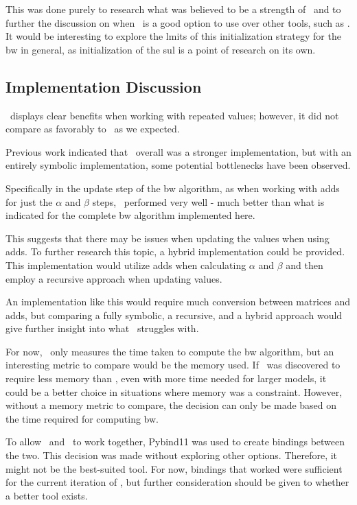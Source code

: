 This was done purely to research what was believed to be a strength of \Cupaal\ and to further the discussion on when \Cupaal\ is a good option to use over other tools, such as \Jajapy.
It would be interesting to explore the lmits of this initialization strategy for the \gls{bw} in general, as initialization of the \gls{sul} is a point of research on its own.


\subsection{Implementation Discussion}\label{subsec:implementation_discussion}
\Cupaal\ displays clear benefits when working with repeated values; however, it did not compare as favorably to \Jajapy\ as we expected.

Previous work indicated that \Cupaal\ overall was a stronger implementation, but with an entirely symbolic implementation, some potential bottlenecks have been observed.

Specifically in the update step of the \gls{bw} algorithm, as when working with \glspl{add} for just the $\alpha$ and $\beta$ steps, \Cupaal\ performed very well - much better than what is indicated for the complete \gls{bw} algorithm implemented here.

This suggests that there may be issues when updating the values when using \glspl{add}.
To further research this topic, a hybrid implementation could be provided.
This implementation would utilize \glspl{add} when calculating $\alpha$ and $\beta$ and then employ a recursive approach when updating values.

An implementation like this would require much conversion between matrices and \glspl{add}, but comparing a fully symbolic, a recursive, and a hybrid approach would give further insight into what \Cupaal\ struggles with.

For now, \Cupaal\ only measures the time taken to compute the \gls{bw} algorithm, but an interesting metric to compare would be the memory used.
If \Cupaal\ was discovered to require less memory than \Jajapy, even with more time needed for larger models, it could be a better choice in situations where memory was a constraint.
However, without a memory metric to compare, the decision can only be made based on the time required for computing \gls{bw}.

To allow \Cupaal\ and \Jajapy\ to work together, Pybind11 was used to create bindings between the two.
This decision was made without exploring other options. Therefore, it might not be the best-suited tool.
For now, bindings that worked were sufficient for the current iteration of \Cupaal, but further consideration should be given to whether a better tool exists.

